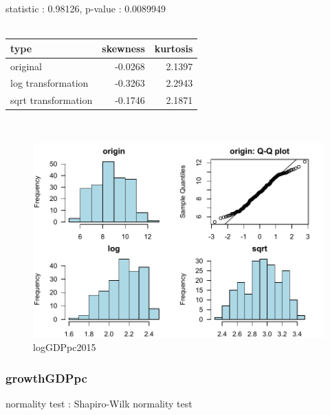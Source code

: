 \documentclass{book}\usepackage[]{graphicx}\usepackage[]{color}
\begin{document}
\noindent statistic : 0.98126,  p-value : 0.0089949\\
\\%
\begin{tabular}{lrr}
  \toprule
type & skewness & kurtosis \\ 
  \midrule
original & -0.0268 & 2.1397 \\ 
  log transformation & -0.3263 & 2.2943 \\ 
  sqrt transformation & -0.1746 & 2.1871 \\ 
   \bottomrule
\end{tabular}
\\
\begin{figure}[!ht]
\centering
\includegraphics[width=1.0\textwidth]{figure/norm3.pdf}
\caption{logGDPpc2015}
\end{figure}
\clearpage
\subsubsection{ growthGDPpc }

normality test : Shapiro-Wilk normality test
\end{document}
